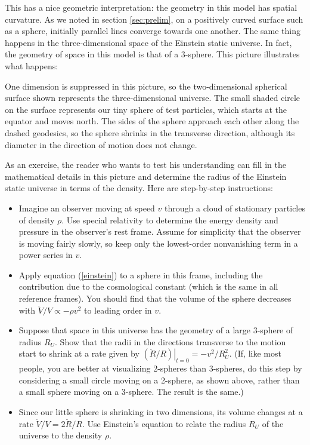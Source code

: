 This has a nice geometric interpretation: the geometry in this model
has spatial curvature.  As we noted in section \ref{sec:prelim}, on a
positively curved surface such as a sphere, initially parallel lines
converge towards one another.  The same thing happens in the
three-dimensional space of the Einstein static universe.  In
fact, the geometry of space in this model is that of a 3-sphere.
This picture illustrates what happens:  

\medskip
\centerline{\epsfysize=2.0in} \medskip

\noindent
One dimension is suppressed in this
picture, so the two-dimensional spherical surface shown represents the
three-dimensional universe.  The small shaded circle on the
surface represents our tiny sphere of test particles, which starts at
the equator and moves north.  The sides of the sphere approach each
other along the dashed geodesics, so the sphere shrinks in the
transverse direction, although its diameter in the direction of motion
does not change.

As an exercise, the reader who wants to test his understanding can fill in the
mathematical details in this picture and determine the
radius of the Einstein static universe in terms of the density.
Here are step-by-step instructions:

\begin{itemize}

\item Imagine an observer moving at speed $v$ through a cloud of
stationary particles of density $\rho$.  Use special relativity
to determine the energy density and pressure in the observer's
rest frame.  Assume for simplicity that the observer is
moving fairly slowly, so keep only the lowest-order nonvanishing
term in a power series in $v$.

\item Apply equation (\ref{einstein}) to a sphere in this 
frame, including the contribution due to the cosmological
constant (which is the same in all reference frames).
You should find that the volume of the sphere decreases
with $\ddot V/V\propto -\rho v^2$ to leading order in $v$.


\item Suppose that space in this universe has the geometry of a large
3-sphere of radius $R_U$.  Show that the radii in the directions
transverse to the motion start to shrink at a rate given by 
$\left.(\ddot R/R)\right|_{t=0}
= -v^2/R_U^2$.  (If, like most people, you are better at visualizing
2-spheres than 3-spheres, do this step by considering a small circle
moving on a 2-sphere, as shown above, rather than a small sphere
moving on a 3-sphere.  The result is the same.)


\item Since our little sphere is shrinking in two dimensions, its
volume changes at a rate $\ddot V/V = 2\ddot R/R$.  Use Einstein's
equation to relate the radius $R_U$ of the universe to the
density $\rho$.

\end{itemize}

